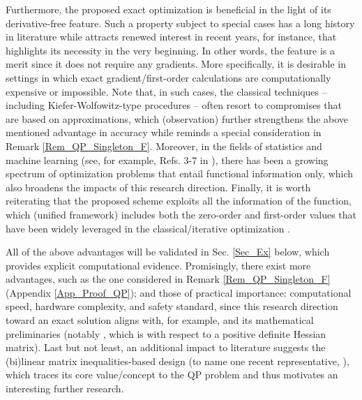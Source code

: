 \documentclass{imaman}
\numberwithin{equation}{section}
\begin{document}
Furthermore, the proposed exact optimization is beneficial in the light of its derivative-free feature. Such a property subject to special cases has a long history in literature while attracts renewed interest in recent years, for instance, \cite{DuJoWaWi:15} that highlights its necessity in the very beginning. In other words, the feature is a merit since it does not require any gradients. More specifically, it is desirable in settings in which exact gradient/first-order calculations are computationally expensive or impossible. Note that, in such cases, the classical techniques -- including Kiefer-Wolfowitz-type procedures \cite{KuYi:03} -- often resort to compromises that are based on approximations, which (observation) further strengthens the above mentioned advantage in accuracy while reminds a special consideration in Remark \ref{Rem_QP_Singleton_F}. Moreover, in the fields of statistics and machine learning (see, for example, Refs. 3-7 in \cite{DuJoWaWi:15}), there has been a growing spectrum of optimization problems that entail functional information only, which also broadens the impacts of this research direction. Finally, it is worth reiterating that the proposed scheme exploits all the information of the function, which (unified framework) includes both the zero-order \cite{DuJoWaWi:15} and first-order values that have been widely leveraged in the classical/iterative optimization \cite{Lu(Ye):03(16),NoWr:06}.

All of the above advantages will be validated in Sec. \ref{Sec_Ex} below, which provides explicit computational evidence. Promisingly, there exist more advantages, such as the one considered in Remark \ref{Rem_QP_Singleton_F} (Appendix \ref{App_Proof_QP}); and those of practical importance: computational speed, hardware complexity, and safety standard, since this research direction toward an exact solution aligns with, for example, \cite{JoFoTo:05} and its mathematical preliminaries (notably \cite{BeMoDuPi:02}, which is with respect to a positive definite Hessian matrix). Last but not least, an additional impact to literature suggests the (bi)linear matrix inequalities-based design (to name one recent representative, \cite{MiHa:acc}), which traces its core value/concept to the QP problem and thus motivates an interesting further research.
\end{document}
